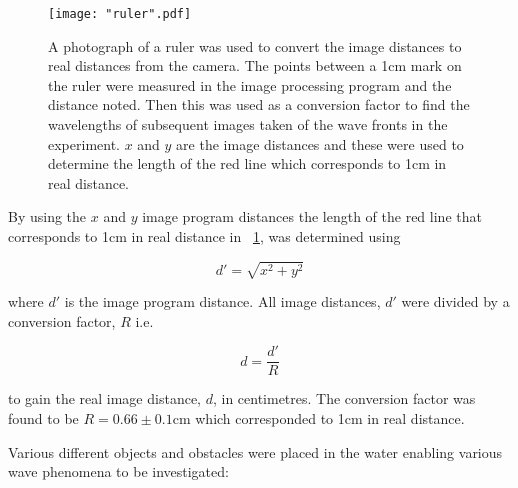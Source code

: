 \documentclass{article}
\newcommand{\figref}[2][\figurename~]{#1\ref{#2}}
\begin{document}
\begin{figure}[h]
\centering
\texttt{[image: "ruler".pdf]}
\caption{A photograph of a ruler was used to convert the image distances to real distances from the camera. The points between a 1cm mark on the ruler were measured in the image processing program and the distance noted. Then this was used as a conversion factor to find the wavelengths of subsequent images taken of the wave fronts in the experiment. $x$ and $y$ are the image distances and these were used to determine the length of the red line which corresponds to 1cm in real distance.}
\label{fig:ruler}
\end{figure}

\newpage
\vspace{2mm}
\noindent
By using the $x$ and $y$ image program distances the length of the red line that corresponds to 1cm in real distance in \figref{fig:ruler}, was determined using 

\vspace{2mm}
\noindent
\begin{equation}
\label{eq:pythagoras}
d' = \sqrt{x^2 + y^2}
\end{equation}

\vspace{2mm}
\noindent
where $d'$ is the image program distance. All image distances, $d'$ were divided by a conversion factor, $R$ i.e.

\vspace{2mm}
\noindent
\begin{equation}
\label{eq:conversion}
d = \frac{d'}{R}
\end{equation}

\vspace{2mm}
\noindent
to gain the real image distance, $d$, in centimetres. The conversion factor was found to be $R = 0.66 \pm 0.1$cm which corresponded to 1cm in real distance.

\vspace{2mm}
\noindent
Various different objects and obstacles were placed in the water enabling various wave phenomena to be investigated:
\end{document}
